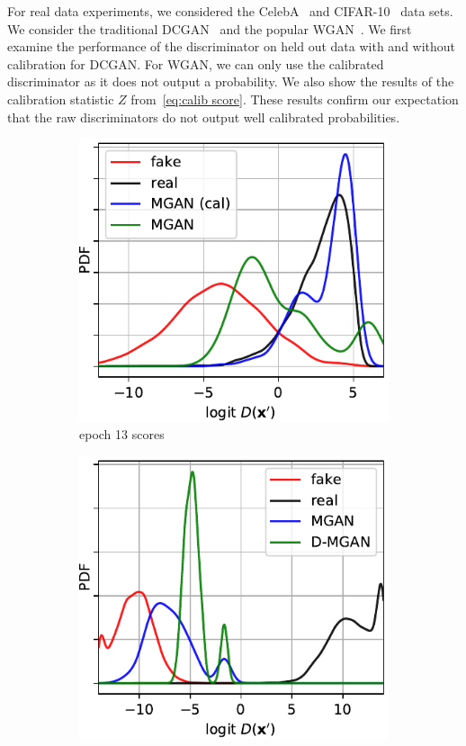 \documentclass{article}
\begin{document}
For real data experiments, we considered the CelebA~\citep{Liu2015} and CIFAR-10~\citep{Torralba2008} data sets.
We consider the traditional DCGAN~\citep{Radford2015} and the popular WGAN~\citep{Arjovsky2017}\@.
We first examine the performance of the discriminator on held out data with and without calibration for DCGAN\@.
For WGAN, we can only use the calibrated discriminator as it does not output a probability.
We also show the results of the calibration statistic $Z$ from~\eqref{eq:calib score}.
These results confirm our expectation that the raw discriminators do not output well calibrated probabilities.

\begin{figure}
    \centering
    \begin{subfigure}[b]{0.49\textwidth}
       \centering
       \includegraphics[scale=0.9]{figures/score_dist_overlap.pdf}
       \caption{epoch 13 scores}
       \label{fig:score_dist_overlap}
    \end{subfigure}
    \begin{subfigure}[b]{0.49\textwidth}
       \centering
       \includegraphics[scale=0.9]{figures/score_dist_no_overlap.pdf}

\end{subfigure}
\end{figure}
\end{document}
